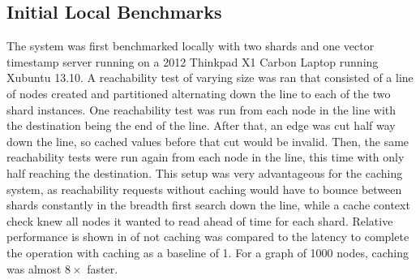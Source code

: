 \documentclass[letterpaper,twocolumn,11pt,tight]{article}
\begin{document}
\subsection{Initial Local Benchmarks}
The system was first benchmarked locally with two shards and one vector timestamp server running on a 2012 Thinkpad X1 Carbon Laptop running Xubuntu 13.10. A reachability test of varying size was ran that consisted of a line of nodes created and partitioned alternating down the line to each of the two shard instances.
One reachability test was run from each node in the line with the destination being the end of the line. After that, an edge was cut half way down the line, so cached values before that cut would be invalid. Then, the same reachability tests were run again from each node in the line, this time with only half reaching the destination. This setup was very advantageous for the caching system, as reachability requests without caching would have to bounce between shards constantly in the breadth first search down the line, while a cache context check knew all nodes it wanted to read ahead of time for each shard. Relative performance is shown in  of not caching was compared to the latency to complete the operation with caching as a baseline of 1. For a graph of 1000 nodes, caching was almost $8\times$ faster.

\end{document}
